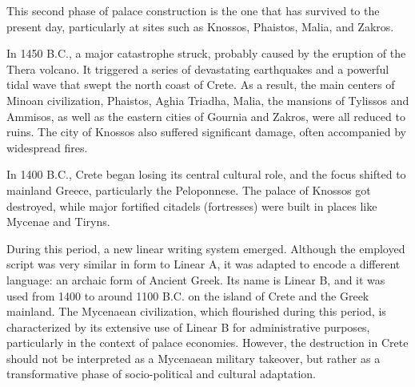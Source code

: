 This second phase of palace construction is the one that has survived to the present day, particularly at sites such as Knossos, Phaistos, Malia, and Zakros.

In 1450 B.C., a major catastrophe struck, probably caused by the eruption of the Thera volcano.
It triggered a series of devastating earthquakes and a powerful tidal wave that swept the north coast of Crete.
As a result, the main centers of Minoan civilization, Phaistos, Aghia Triadha, Malia, the mansions of Tylissos and Ammisos, as well as the eastern cities of Gournia and Zakros, were all reduced to ruins.
The city of Knossos also suffered significant damage, often accompanied by widespread fires. \cite{alexiou-ch4}

In 1400 B.C., Crete began losing its central cultural role, and the focus shifted to mainland Greece, particularly the Peloponnese.
The palace of Knossos got destroyed, while major fortified citadels (fortresses) were built in places like Mycenae and Tiryns. \cite{alexiou-ch5}

During this period, a new linear writing system emerged.
Although the employed script was very similar in form to Linear A, it was adapted to encode a different language: an archaic form of Ancient Greek.
Its name is Linear B, and it was used from 1400 to around 1100 B.C. on the island of Crete and the Greek mainland.
The Mycenaean civilization, which flourished during this period, is characterized by its extensive use of Linear B for administrative purposes, particularly in the context of palace economies.
However, the destruction in Crete should not be interpreted as a Mycenaean military takeover, but rather as a transformative phase of socio-political and cultural adaptation.


